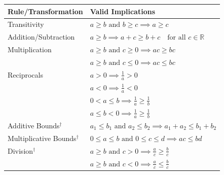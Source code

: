 \renewcommand{\arraystretch}{1.4} %
\vspace{-0.2in}
\begin{center}
\begin{tabular}{|p{3.5cm}|p{11.1cm}|}
\hline
\textbf{Rule/Transformation} & \textbf{Valid Implications} \\
\hline
Transitivity &
$ a \geq b \text{ and } b \geq c \implies a \geq c $ \\
\hline
Addition/Subtraction &
$ a \geq b \implies a + c \geq b + c \quad \text{for all } c \in \mathbb{R} $ \\
\hline
Multiplication &
$ a \geq b \text{ and } c \geq 0 \implies ac \geq bc $ \\
& $ a \geq b \text{ and } c \leq 0 \implies ac \leq bc $ \\
\hline
Reciprocals &
$a>0 \implies \frac{1}{a}>0$ \\
& $a<0 \implies \frac{1}{a}<0$ \\
&$ 0 < a \leq b \implies \frac{1}{a} \geq \frac{1}{b} $ \\
& $ a \leq b < 0 \implies \frac{1}{a} \geq \frac{1}{b} $ \\
\hline
Additive Bounds$^\dagger$ &
$ a_1 \leq b_1 \text{ and } a_2 \leq b_2 \implies a_1 + a_2 \leq b_1 + b_2 $ \\
\hline
Multiplicative Bounds$^\dagger$ &
$ 0 \leq a \leq b \text{ and } 0 \leq c \leq d \implies ac \leq bd $ \\
\hline
Division$^\dagger$ &
$ a \geq b \text{ and } c > 0 \implies \frac{a}{c} \geq \frac{b}{c} $ \\
& $ a \geq b \text{ and } c < 0 \implies \frac{a}{c} \leq \frac{b}{c} $ \\

\end{tabular}
\end{center}
